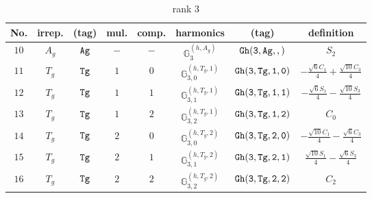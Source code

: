 \documentclass[fleqn,8pt]{jsarticle}
\begin{document}
\begin{table}[ht!]
\begin{center}
\caption{rank 3}
\renewcommand{\arraystretch}{1.3}
\begin{tabular}{cccccccc} \hline \hline
No. & irrep. & (tag) & mul. & comp. & harmonics & (tag) & definition \\ \hline
$ 10 $ & $ A_{g} $ & $ {\tt Ag} $ & $ - $ & $ - $ & $ \mathbb{G}_{3}^{(h,A_{g})} $ & $ {\tt Gh(3,Ag,,)} $ & $ S_{2} $ \\
$ 11 $ & $ T_{g} $ & $ {\tt Tg} $ & $ 1 $ & $ 0 $ & $ \mathbb{G}_{3,0}^{(h,T_{g},1)} $ & $ {\tt Gh(3,Tg,1,0)} $ & $ - \frac{\sqrt{6} C_{1}}{4} + \frac{\sqrt{10} C_{3}}{4} $ \\
$ 12 $ & $ T_{g} $ & $ {\tt Tg} $ & $ 1 $ & $ 1 $ & $ \mathbb{G}_{3,1}^{(h,T_{g},1)} $ & $ {\tt Gh(3,Tg,1,1)} $ & $ - \frac{\sqrt{6} S_{1}}{4} - \frac{\sqrt{10} S_{3}}{4} $ \\
$ 13 $ & $ T_{g} $ & $ {\tt Tg} $ & $ 1 $ & $ 2 $ & $ \mathbb{G}_{3,2}^{(h,T_{g},1)} $ & $ {\tt Gh(3,Tg,1,2)} $ & $ C_{0} $ \\
$ 14 $ & $ T_{g} $ & $ {\tt Tg} $ & $ 2 $ & $ 0 $ & $ \mathbb{G}_{3,0}^{(h,T_{g},2)} $ & $ {\tt Gh(3,Tg,2,0)} $ & $ - \frac{\sqrt{10} C_{1}}{4} - \frac{\sqrt{6} C_{3}}{4} $ \\
$ 15 $ & $ T_{g} $ & $ {\tt Tg} $ & $ 2 $ & $ 1 $ & $ \mathbb{G}_{3,1}^{(h,T_{g},2)} $ & $ {\tt Gh(3,Tg,2,1)} $ & $ \frac{\sqrt{10} S_{1}}{4} - \frac{\sqrt{6} S_{3}}{4} $ \\
$ 16 $ & $ T_{g} $ & $ {\tt Tg} $ & $ 2 $ & $ 2 $ & $ \mathbb{G}_{3,2}^{(h,T_{g},2)} $ & $ {\tt Gh(3,Tg,2,2)} $ & $ C_{2} $ \\
 \hline \hline
\end{tabular}
\end{center}
\end{table}
\end{document}
